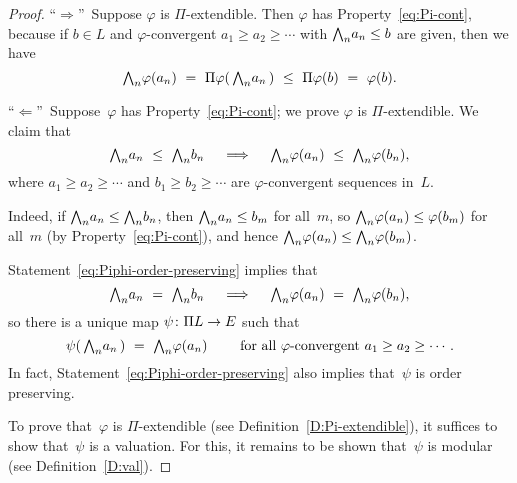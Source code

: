 \documentclass[main.tex]{subfiles}
\begin{document}
\begin{proof}
``$\Longrightarrow$''\ 
Suppose $\varphi$ is $\Pi$-extendible.
Then $\varphi$ has Property~\eqref{eq:Pi-cont},
because if $b\in L$ and $\varphi$-convergent $a_1 \geq a_2 \geq \dotsb$
with $\textstyle{\bigwedge}_n a_n \leq b$ are given,
then we have
\begin{equation*}
\bw_n \varphi(a_n) 
\ =\ 
\Pi\varphi(\,\bw_n a_n\,)
\ \leq\ 
\Pi\varphi(b)
\ =\ 
\varphi(b).
\end{equation*}

\noindent``$\Longleftarrow$''\ 
Suppose~$\varphi$ has Property~\eqref{eq:Pi-cont};
we prove $\varphi$ is $\Pi$-extendible.
We claim that
\begin{equation}
\label{eq:Piphi-order-preserving}
\textstyle{\bigwedge}_n a_n \ \leq\ \textstyle{\bigwedge}_n b_n 
\quad\implies\quad
\textstyle{\bigwedge}_n \varphi(a_n) \ \leq\ \textstyle{\bigwedge}_n \varphi(b_n),
\end{equation}
where $a_1 \geq a_2 \geq \dotsb$ and $b_1 \geq b_2 \geq \dotsb$
are $\varphi$-convergent sequences in~$L$.

Indeed,
if $\textstyle{\bigwedge}_n a_n \leq \textstyle{\bigwedge}_n b_n$,
then $\textstyle{\bigwedge}_n a_n \leq b_m$ for all~$m$,
so $\textstyle{\bigwedge}_n \varphi(a_n) \leq \varphi(b_m)$ for all~$m$
(by Property~\eqref{eq:Pi-cont}),
and hence $\textstyle{\bigwedge}_n \varphi(a_n) \leq \textstyle{\bigwedge}_n \varphi(b_m)$.

Statement~\eqref{eq:Piphi-order-preserving} implies that
\begin{equation*}
\textstyle{\bigwedge}_n a_n \ =\  \textstyle{\bigwedge}_n b_n 
\quad\implies\quad 
\textstyle{\bigwedge}_n\varphi(a_n) \ =\  \textstyle{\bigwedge}_n \varphi(b_n),
\end{equation*}
so there is a unique map $\psi\colon \Pi L \rightarrow E$ such that
\begin{equation}
\label{eq:def-psi}
\psi(\,\textstyle{\bigwedge}_n a_n\,) \ =\ \textstyle{\bigwedge}_n \varphi(a_n)
\qquad
\text{ for all $\varphi$-convergent }a_1 \geq a_2 \geq \dotsb.
\end{equation}
In fact, 
Statement~\eqref{eq:Piphi-order-preserving}
also implies that~$\psi$ is order preserving.

To prove that~$\varphi$ is $\Pi$-extendible
(see Definition~\ref{D:Pi-extendible}),
it suffices to show that~$\psi$ is a valuation.
For this,
it remains to be shown that~$\psi$ is modular
(see Definition~\ref{D:val}).


\end{proof}
\end{document}
